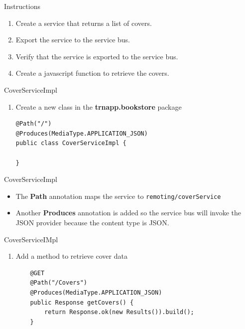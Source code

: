 \documentclass[xcolor=dvipsnames,14pt,professionalfonts]{beamer}
\begin{document}
\begin{frame}{Instructions}
  \begin{enumerate}
  \item Create a service that returns a list of covers.
  \item Export the service to the service bus.
  \item Verify that the service is exported to the service bus.
  \item Create a javascript function to retrieve the covers.
  \end{enumerate}
  \end{frame}

\begin{frame}[fragile]{CoverServiceImpl}
  \begin{enumerate}
    \item Create a new class in the \textbf{trnapp.bookstore} package
    \begin{verbatim}
@Path("/")
@Produces(MediaType.APPLICATION_JSON)
public class CoverServiceImpl {

}
\end{verbatim}
\end{enumerate}
\end{frame}

\begin{frame}{CoverServiceImpl}
  \begin{itemize}
    \item The \textbf{Path} annotation maps the service to
      \texttt{remoting/coverService}
    \item Another \textbf{Produces} annotation is added so the service
      bus will invoke the JSON provider because the content type is JSON.
  \end{itemize}
\end{frame}

\begin{frame}[fragile]{CoverServiceIMpl}
  \begin{enumerate}
    \item Add a method to retrieve cover data
    \begin{verbatim}
    @GET
    @Path("/Covers")
    @Produces(MediaType.APPLICATION_JSON)
    public Response getCovers() {    	    	
    	return Response.ok(new Results()).build();
    }
\end{verbatim}
\end{enumerate}
\end{frame}
\end{document}
